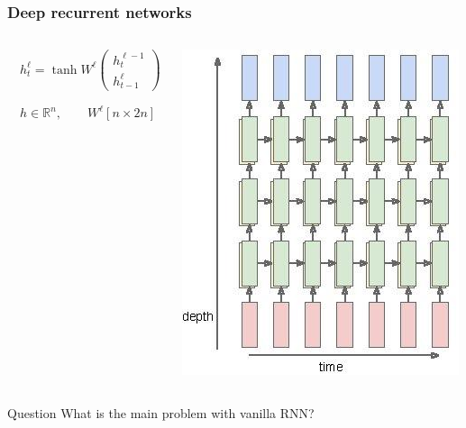 \documentclass[fullscreen=true, bookmarks=true, hyperref={pdfencoding=unicode}]{beamer}
\begin{document}
\begin{frame}
  \frametitle{Deep recurrent networks}
  \begin{columns}
      \begin{column}{.4\paperwidth}
        $\quad h_t^\ell = \tanh W^\ell \left(\begin{array}{c}
         h_t^{\ell-1} \\ h_{t-1}^{\ell}
        \end{array}\right)$

        $\quad h \in \mathbb{R}^n, \quad\quad W^\ell [n \times 2n]$
      \end{column}
      \begin{column}{.4\paperwidth}
        \includegraphics[keepaspectratio,
                         width=0.4\paperwidth]{rnn_depth.jpg}
      \end{column}
  \end{columns}
  \pause
  \begin{block}{Question}
  What is the main problem with vanilla RNN?
  \end{block}
\end{frame}

\end{document}
